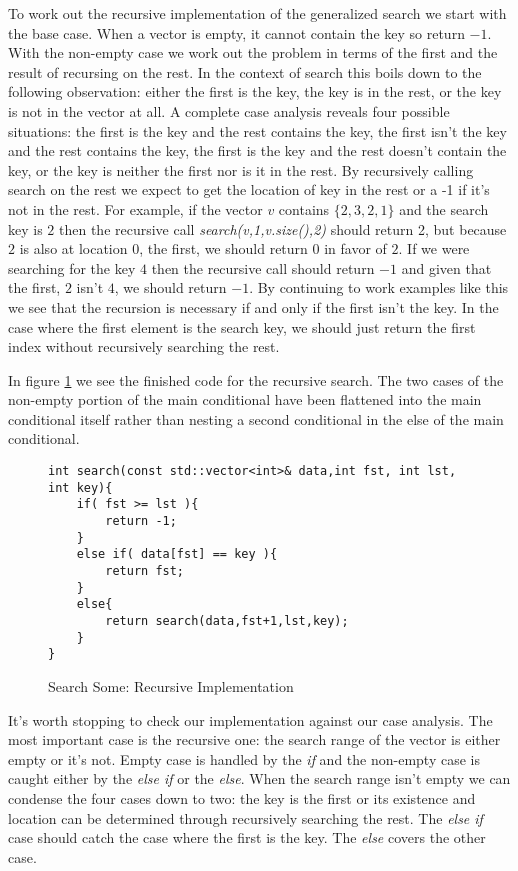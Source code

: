 \documentclass[]{tufte-handout}
\begin{document}
To work out the recursive implementation of the generalized search we start with the base case. When a vector is empty, it cannot contain the key so return $-1$. With the non-empty case we work out the problem in terms of the first and the result of recursing on the rest. In the context of search this boils down to the following observation: either the first is the key, the key is in the rest, or the key is not in the vector at all. A complete case analysis reveals four possible situations: the first is the key and the rest contains the key, the first isn't the key and the rest contains the key, the first is the key and the rest doesn't contain the key, or the key is neither the first nor is it in the rest. By recursively calling search on the rest we expect to get the location of key in the rest or a -1 if it's not in the rest.  For example, if the vector $v$ contains $\{2,3,2,1\}$ and the search key is $2$ then the recursive call \textit{search(v,1,v.size(),2)} should return 2, but because $2$ is also at location $0$, the first, we should return $0$ in favor of $2$.  If we were searching for the key $4$ then the recursive call should return $-1$ and given that the first, $2$ isn't $4$, we should return $-1$. By continuing to work examples like this we see that the recursion is necessary if and only if the first isn't the key. In the case where the first element is the search key, we should just return the first index without recursively searching the rest. 

In figure \ref{code:searchrecwork} we see the finished code for the recursive search. The two cases of the non-empty portion of the main conditional have been flattened into the main conditional itself rather than nesting a second conditional in the else of the main conditional. 
\begin{figure}[htpb!]
\begin{lstlisting}
int search(const std::vector<int>& data,int fst, int lst, int key){
	if( fst >= lst ){
		return -1;
	}
	else if( data[fst] == key ){
		return fst;
	}
	else{
		return search(data,fst+1,lst,key);
	}
}
\end{lstlisting}
\label{code:searchrecwork}
\caption{Search Some: Recursive Implementation}
\end{figure}

It's worth stopping to check our implementation against our case analysis. The most important case is the recursive one: the search range of the vector is either empty or it's not. Empty case is handled by the \textit{if} and the non-empty case is caught either by the \textit{else if} or the \textit{else}. When the search range isn't empty we can condense the four cases down to two: the key is the first or its existence and location can be determined through recursively searching the rest. The \textit{else if} case should catch the case where the first is the key. The \textit{else} covers the other case. 
\end{document}
